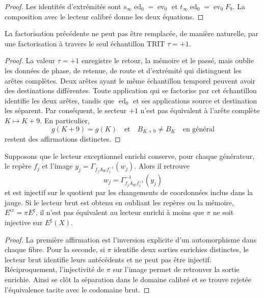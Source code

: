 \begin{proof}
Les identités d'extrémités sont
\(s_\infty\operatorname{ed}_0=\operatorname{ev}_0\) et
\(t_\infty\operatorname{ed}_0=\operatorname{ev}_0F_9\). La composition avec
le lecteur calibré donne les deux équations.
\end{proof}

\begin{corollary}
\label{cor:hmt-final-no-equivalencia-retorno-gamma}
La factorisation précédente ne peut pas être remplacée, de manière naturelle, par une
factorisation à travers le seul échantillon TRIT \(\tau=+1\).
\end{corollary}

\begin{proof}
La valeur \(\tau=+1\) enregistre le retour, la mémoire et le passé, mais oublie les données
de phase, de retenue, de route et d'extrémité qui distinguent les arêtes complètes. Deux arêtes
ayant le même échantillon temporel peuvent avoir des destinations différentes. Toute application qui
se factorise par cet échantillon identifie les deux arêtes, tandis que
\(\operatorname{ed}_0\) et ses applications source et destination les séparent. Par conséquent,
le secteur \(+1\) n'est pas équivalent à l'arête complète \(K\mapsto K+9\).
En particulier,
\[
 g(K+9)=g(K)
 \quad\text{et}\quad
 B_{K+9}\ne B_K\quad\text{en général}
\]
restent des affirmations distinctes.
\end{proof}

\begin{proposition}
\label{prop:hmt-final-separacion-enriquecida-no-cruda}
Supposons que le lecteur exceptionnel enrichi conserve, pour chaque
générateur, le repère \(f_j\) et l'image
\(y_j=\Gamma_{f_jA_Wf_j^{-1}}(w_j)\). Alors il retrouve
\[
 w_j=\Gamma_{f_jA_Wf_j^{-1}}^{-1}(y_j)
\]
et est injectif sur le quotient par les changements de coordonnées inclus dans la
jauge. Si le lecteur brut est obtenu en oubliant les repères ou la mémoire,
\(E^{\mathrm{cr}}=\pi E^{\sharp}\), il n'est pas équivalent au lecteur enrichi
à moins que \(\pi\) ne soit injective sur \(E^{\sharp}(X)\).
\end{proposition}

\begin{proof}
La première affirmation est l'inversion explicite d'un automorphisme dans chaque
fibre. Pour la seconde, si \(\pi\) identifie deux sorties enrichies
distinctes, le lecteur brut identifie leurs antécédents et ne peut pas être
injectif. Réciproquement, l'injectivité de \(\pi\) sur l'image permet de
retrouver la sortie enrichie. Ainsi se clôt la séparation dans le domaine
calibré et se trouve rejetée l'équivalence tacite avec le codomaine brut.
\end{proof}

